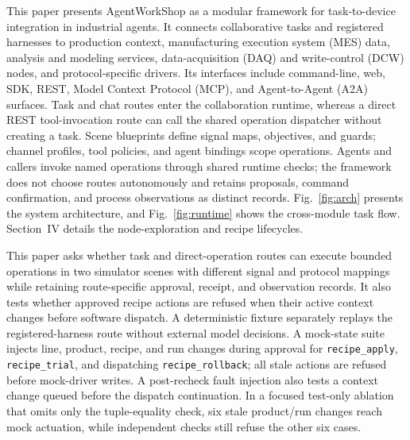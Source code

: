 This paper presents AgentWorkShop as a modular framework for task-to-device
integration in industrial agents. It connects collaborative tasks
and registered harnesses to production context, manufacturing execution
system (MES) data, analysis and modeling services, data-acquisition (DAQ) and
write-control (DCW) nodes, and protocol-specific drivers. Its interfaces include
command-line, web, SDK, REST, Model Context Protocol (MCP), and Agent-to-Agent
(A2A) surfaces. Task and chat routes enter the
collaboration runtime, whereas a direct REST tool-invocation route can call
the shared operation dispatcher without creating a task.
Scene blueprints define signal maps, objectives, and guards; channel profiles,
tool policies, and agent bindings scope operations. Agents and callers invoke
named operations through shared runtime checks; the framework does not choose
routes autonomously and retains proposals, command confirmation, and process
observations as distinct records. Fig.~\ref{fig:arch} presents the system
architecture, and Fig.~\ref{fig:runtime} shows the cross-module task flow.
Section~IV details the node-exploration and recipe lifecycles.

This paper asks whether task and direct-operation routes can execute bounded
operations in two simulator scenes with different signal and protocol
mappings while retaining route-specific approval, receipt, and observation
records. It also tests whether approved recipe actions are refused when their
active context changes before software dispatch. A deterministic fixture
separately replays the registered-harness route without external model
decisions. A mock-state suite injects line,
product, recipe, and run changes during approval for \texttt{recipe\_apply},
\texttt{recipe\_trial}, and dispatching \texttt{recipe\_rollback}; all stale
actions are refused before mock-driver writes. A post-recheck fault injection
also tests a context change queued before the dispatch continuation. In a
focused test-only ablation that omits only the tuple-equality check, six
stale product/run changes reach mock actuation, while independent checks still
refuse the other six cases.


